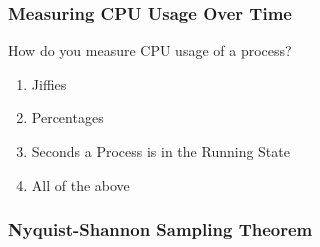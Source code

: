 \begin{frame}[fragile]
    \frametitle{Measuring CPU Usage Over Time}

    How do you measure CPU usage of a process?
    \begin{enumerate}[label=\alph*.]
        \item Jiffies
        \item Percentages
        \item Seconds a Process is in the Running State
        \item All of the above
    \end{enumerate}
\end{frame}

\begin{frame}
    \frametitle{Nyquist-Shannon Sampling Theorem}

\end{frame}








